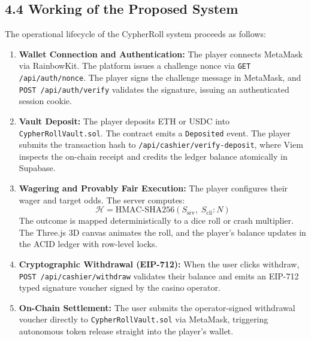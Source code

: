 \subsection*{4.4 Working of the Proposed System}
The operational lifecycle of the CypherRoll system proceeds as follows:
\begin{enumerate}[leftmargin=1.5em]
    \item \textbf{Wallet Connection and Authentication:} The player connects MetaMask via RainbowKit. The platform issues a challenge nonce via \texttt{GET /api/auth/nonce}. The player signs the challenge message in MetaMask, and \texttt{POST /api/auth/verify} validates the signature, issuing an authenticated session cookie.
    \item \textbf{Vault Deposit:} The player deposits ETH or USDC into \texttt{CypherRollVault.sol}. The contract emits a \texttt{Deposited} event. The player submits the transaction hash to \texttt{/api/cashier/verify-deposit}, where Viem inspects the on-chain receipt and credits the ledger balance atomically in Supabase.
    \item \textbf{Wagering and Provably Fair Execution:} The player configures their wager and target odds. The server computes:
    $$\mathcal{H} = \text{HMAC-SHA256}(S_{\text{srv}}, \; S_{\text{cli}} : N)$$
    The outcome is mapped deterministically to a dice roll or crash multiplier. The Three.js 3D canvas animates the roll, and the player's balance updates in the ACID ledger with row-level locks.
    \item \textbf{Cryptographic Withdrawal (EIP-712):} When the user clicks withdraw, \texttt{POST /api/cashier/withdraw} validates their balance and emits an EIP-712 typed signature voucher signed by the casino operator.
    \item \textbf{On-Chain Settlement:} The user submits the operator-signed withdrawal voucher directly to \texttt{CypherRollVault.sol} via MetaMask, triggering autonomous token release straight into the player's wallet.
\end{enumerate}


